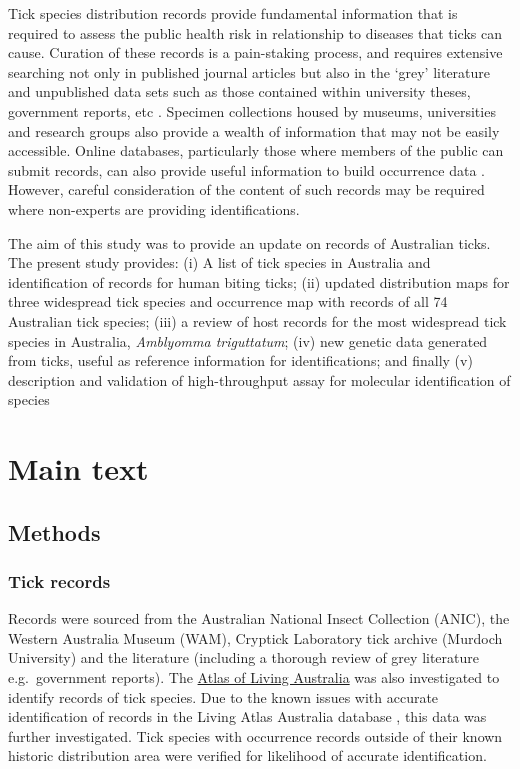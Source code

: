 \documentclass[a4paper, nobind]{templates/ociamthesis}
\begin{document}
Tick species distribution records provide fundamental information that is required to assess the public health risk in relationship to diseases that ticks can cause.
Curation of these records is a pain-staking process, and requires extensive searching not only in published journal articles but also in the `grey' literature and unpublished data sets such as those contained within university theses, government reports, etc \autocite{estrada-penaSpeciesOccurrenceTicks2019}.
Specimen collections housed by museums, universities and research groups also provide a wealth of information that may not be easily accessible.
Online databases, particularly those where members of the public can submit records, can also provide useful information to build occurrence data \autocite{belbinAtlasLivingAustralia2021}.
However, careful consideration of the content of such records may be required where non-experts are providing identifications.

The aim of this study was to provide an update on records of Australian ticks.
The present study provides: (i) A list of tick species in Australia and identification of records for human biting ticks; (ii) updated distribution maps for three widespread tick species and occurrence map with records of all 74 Australian tick species; (iii) a review of host records for the most widespread tick species in Australia, \emph{Amblyomma triguttatum}; (iv) new genetic data generated from ticks, useful as reference information for identifications; and finally (v) description and validation of high-throughput assay for molecular identification of species

\hypertarget{main-text}{%
\section{Main text}\label{main-text}}

\hypertarget{methods}{%
\subsection{Methods}\label{methods}}

\hypertarget{tick-records}{%
\subsubsection{Tick records}\label{tick-records}}

Records were sourced from the Australian National Insect Collection (ANIC), the Western Australia Museum (WAM), Cryptick Laboratory tick archive (Murdoch University) and the literature (including a thorough review of grey literature e.g.~government reports).
The \href{https://www.ala.org.au/}{Atlas of Living Australia} was also investigated to identify records of tick species.
Due to the known issues with accurate identification of records in the Living Atlas Australia database \autocite{belbinAtlasLivingAustralia2021}, this data was further investigated.
Tick species with occurrence records outside of their known historic distribution area were verified for likelihood of accurate identification.
\end{document}

